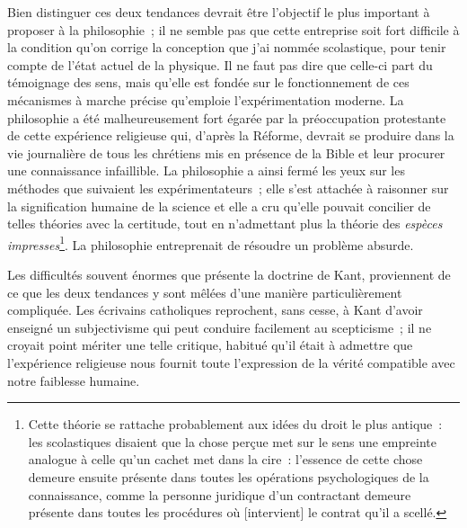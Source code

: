 \documentclass[french,twoside]{book} %
\newcommand\corr[1]{#1}
\begin{document}
Bien distinguer ces deux tendances devrait être l’objectif le plus important à proposer à la philosophie ; il ne semble pas que cette entreprise soit fort difficile à la condition qu’on corrige la conception que j’ai nommée scolastique, pour tenir compte de l’état actuel de la physique. Il ne faut pas dire que celle-ci part du témoignage des sens, mais qu’elle est fondée sur le fonctionnement de ces mécanismes à marche précise qu’emploie l’expérimentation moderne. La philosophie a été malheureusement fort égarée par la préoccupation protestante de cette expérience religieuse qui, d’après la Réforme, devrait se produire dans la vie journalière de tous les chrétiens mis en présence de la Bible et leur procurer une connaissance infaillible. La philosophie a ainsi fermé les yeux sur les méthodes que suivaient les expérimentateurs ; elle s’est attachée à raisonner sur la signification humaine de la science et elle a cru qu’elle pouvait concilier de telles théories avec la certitude, tout en n’admettant plus la théorie des \emph{espèces impresses}\footnote{ \noindent Cette théorie se rattache probablement aux idées du droit le plus antique : les scolastiques disaient que la chose perçue met sur le sens une empreinte analogue à celle qu’un cachet met dans la cire : l’essence de cette chose demeure ensuite présente dans toutes les opérations psychologiques de la connaissance, comme la personne juridique d’un contractant demeure présente dans toutes les procédures où [{\corr intervient}] le contrat qu’il a scellé.
 }. La philosophie entreprenait de résoudre un problème absurde.\par
 Les difficultés souvent énormes que présente la doctrine de Kant, proviennent de ce que les deux tendances y sont mêlées d’une manière particulièrement compliquée. Les écrivains catholiques reprochent, sans cesse, à Kant d’avoir enseigné un subjectivisme qui peut conduire facilement au scepticisme ; il ne croyait point mériter une telle critique, habitué qu’il était à admettre que l’expérience religieuse nous fournit toute l’expression de la vérité compatible avec notre faiblesse humaine.\par
\end{document}
